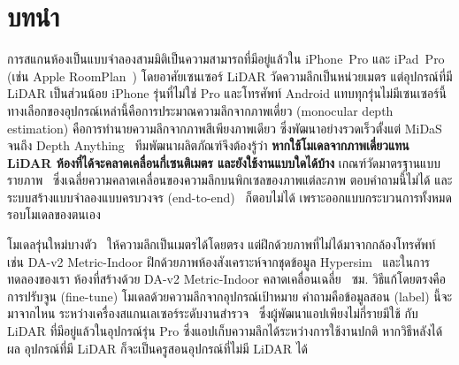 \section{บทนำ}\label{sec:intro}

การสแกนห้องเป็นแบบจำลองสามมิติเป็นความสามารถที่มีอยู่แล้วใน iPhone~Pro และ iPad~Pro
(เช่น Apple RoomPlan~\cite{roomplan}) โดยอาศัยเซนเซอร์ LiDAR วัดความลึกเป็นหน่วยเมตร
แต่อุปกรณ์ที่มี LiDAR เป็นส่วนน้อย iPhone รุ่นที่ไม่ใช่ Pro และโทรศัพท์ Android แทบทุกรุ่นไม่มีเซนเซอร์นี้
ทางเลือกของอุปกรณ์เหล่านี้คือการประมาณความลึกจากภาพเดี่ยว (monocular depth estimation)
คือการทำนายความลึกจากภาพสีเพียงภาพเดียว ซึ่งพัฒนาอย่างรวดเร็วตั้งแต่ MiDaS~\cite{midas}
จนถึง Depth Anything~\cite{da1,da2} ทีมพัฒนาผลิตภัณฑ์จึงต้องรู้ว่า
\textbf{หากใช้โมเดลจากภาพเดี่ยวแทน LiDAR ห้องที่ได้จะคลาดเคลื่อนกี่เซนติเมตร และยังใช้งานแบบใดได้บ้าง}
เกณฑ์วัดมาตรฐานแบบรายภาพ~\cite{eigen14} ซึ่งเฉลี่ยความคลาดเคลื่อนของความลึกบนพิกเซลของภาพแต่ละภาพ
ตอบคำถามนี้ไม่ได้ และระบบสร้างแบบจำลองแบบครบวงจร (end-to-end)~\cite{atlas,neuralrecon,simplerecon}
ก็ตอบไม่ได้ เพราะออกแบบกระบวนการทั้งหมดรอบโมเดลของตนเอง

โมเดลรุ่นใหม่บางตัว~\cite{da2,zoedepth,depthpro} ให้ความลึกเป็นเมตรได้โดยตรง แต่ฝึกด้วยภาพที่ไม่ได้มาจากกล้องโทรศัพท์ เช่น \mbox{DA-v2} Metric-Indoor ฝึกด้วยภาพห้องสังเคราะห์จากชุดข้อมูล
Hypersim~\cite{hypersim} และในการทดลองของเรา ห้องที่สร้างด้วย \mbox{DA-v2} Metric-Indoor
คลาดเคลื่อนเฉลี่ย \rsMETRICCM{}~ซม. วิธีแก้โดยตรงคือการปรับจูน (fine-tune)
โมเดลด้วยความลึกจากอุปกรณ์เป้าหมาย คำถามคือข้อมูลสอน (label) นี้จะมาจากไหน
ระหว่างเครื่องสแกนเลเซอร์ระดับงานสำรวจ~\cite{faro} ซึ่งผู้พัฒนาแอปเพียงไม่กี่รายมีใช้
กับ LiDAR ที่มีอยู่แล้วในอุปกรณ์รุ่น Pro ซึ่งแอปเก็บความลึกได้ระหว่างการใช้งานปกติ
หากวิธีหลังได้ผล อุปกรณ์ที่มี LiDAR ก็จะเป็นครูสอนอุปกรณ์ที่ไม่มี LiDAR ได้

